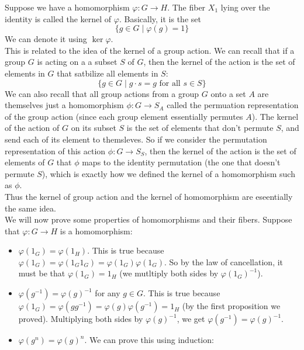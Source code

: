\documentclass[12pt]{article}
\begin{document}
    Suppose we have a homomorphism $\varphi: G \to H$.
    The fiber $X_1$ lying over the identity is called
    the kernel of $\varphi$.
    Basically, it is the set
    \[ \{ g \in G \mid \varphi(g) = 1 \} \]
    We can denote it using $\ker \varphi$. \\
    This is related to the idea of the kernel of a group action.
    We can recall that if a group $G$ is acting
    on a a subset $S$ of $G$,
    then the kernel of the action is the set of elements
    in $G$ that satbilize all elements in $S$:
    \[ \{ g \in G \mid g \cdot s = g \text{ for all } s \in S \}  \]
    We can also recall that all group actions
    from a group $G$ onto a set $A$
    are themselves just a homomorphism $\phi: G \to S_A$
    called the permuation representation of the group action
    (since each group element essentially permutes $A$).
    The kernel of the action of $G$ on its subset $S$
    is the set of elements that don't permute $S$,
    and send each of its element to themsleves.
    So if we consider the permutation representation of this action
    $\phi: G \to S_S$,
    then the kernel of the action is the set of elements of $G$
    that $\phi$ maps to the identity permutation
    (the one that doesn't permute $S$),
    which is exactly how we defined the kernel of a homomorphism
    such as $\phi$. \\
    Thus the kernel of group action and the kernel of homomorphism
    are eseentially the same idea. \\

    We will now prove some properties of homomorphisms
    and their fibers.
    Suppose that $\varphi: G \to H$ is a homomorphism:
    \begin{itemize}[label=$\diamond$]
        \item 
            $\varphi(1_G) = \varphi(1_H)$.
            This is true because
            $\varphi(1_G) = \varphi(1_G1_G) = \varphi(1_G)\varphi(1_G)$.
            So by the law of cancellation,
            it must be that $\varphi(1_G) = 1_H$
            (we mutltiply both sides by $\varphi(1_G)^{-1}$).
        \item     
            $\varphi(g^{-1}) = \varphi(g)^{-1}$
            for any $g \in G$.
            This is true because
            $\varphi(1_G) = \varphi(gg^{-1}) 
            = \varphi(g)\varphi(g^{-1}) = 1_H$
            (by the first proposition we proved).
            Multiplying both sides by $\varphi(g)^{-1}$,
            we get $\varphi(g^{-1}) = \varphi(g)^{-1}$.
        \item
            $\varphi(g^n) = \varphi(g)^n$.
            We can prove this using induction:


    \end{itemize}
\end{document}
